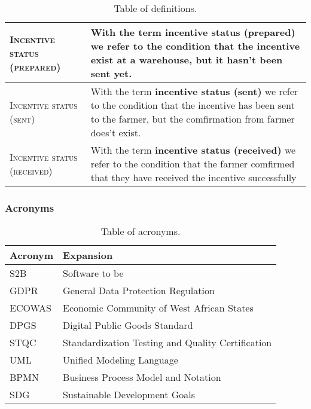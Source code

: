 \begin{table}[H]
\begin{tabular}{|m{}|m{}|}
        \hline
        \textsc{Incentive status (prepared)}     &   With the term \textbf{incentive status (prepared)} we refer to the condition that the incentive exist at a warehouse, but it hasn't been sent yet. \\
        \hline
        \textsc{Incentive status (sent)}     &   With the term \textbf{incentive status (sent)} we refer to the condition that the incentive has been sent to the farmer, but the comfirmation from farmer does't exist. \\
        \hline
        \textsc{Incentive status (received)}     &   With the term \textbf{incentive status (received)} we refer to the condition that the farmer comfirmed that they have received the incentive successfully \\
        \hline
    \end{tabular}
    
    \caption{\label{tab:def_table}Table of definitions.}
    
\end{table}

\subsubsection{Acronyms}
\begin{table}[H]
    \setlength\arrayrulewidth{1pt}
    \centering
    \begin{tabular}{|l|l|}
        \rowcolor{myblue}
        \hline
        \color{white}Acronym & \color{white}Expansion \\
        \hline
        \textsc{S2B}\label{cell:s2b}     &   Software to be \\
        \hline
        \textsc{GDPR}\label{cell:gdpr}  &    General Data Protection Regulation\\
        \hline
        \textsc{ECOWAS}\label{cell:ecowas}  &    Economic Community of West African States\\
        \hline
        \textsc{DPGS}\label{cell:dpgs}  &    Digital Public Goods Standard\\
        \hline
        \textsc{STQC}\label{cell:stqc}  &    Standardization Testing and Quality Certification\\
        \hline
        \textsc{UML}\label{cell:uml}  &    Unified Modeling Language\\
        \hline
        \textsc{BPMN}\label{cell:bpmn}  &    Business Process Model and Notation\\
        \hline
        \textsc{SDG}\label{cell:sdg}  &    Sustainable Development Goals\\
        \hline
    \end{tabular}
    
    \caption{\label{tab:acronyms_table}Table of acronyms.}
    
\end{table}

